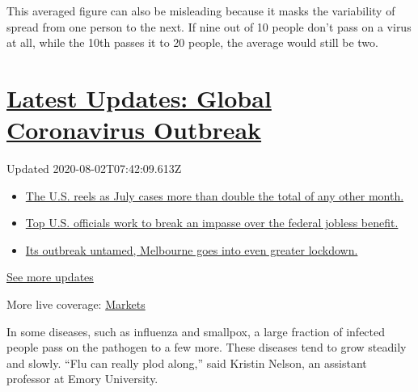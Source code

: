 This averaged figure can also be misleading because it masks the
variability of spread from one person to the next. If nine out of 10
people don't pass on a virus at all, while the 10th passes it to 20
people, the average would still be two.

\hypertarget{latest-updates-global-coronavirus-outbreak}{%
\section{\texorpdfstring{\href{https://www.nytimes.com/2020/08/01/world/coronavirus-covid-19.html?action=click\&pgtype=Article\&state=default\&region=MAIN_CONTENT_1\&context=storylines_live_updates}{Latest
Updates: Global Coronavirus
Outbreak}}{Latest Updates: Global Coronavirus Outbreak}}\label{latest-updates-global-coronavirus-outbreak}}

Updated 2020-08-02T07:42:09.613Z

\begin{itemize}
\tightlist
\item
  \href{https://www.nytimes.com/2020/08/01/world/coronavirus-covid-19.html?action=click\&pgtype=Article\&state=default\&region=MAIN_CONTENT_1\&context=storylines_live_updates\#link-34047410}{The
  U.S. reels as July cases more than double the total of any other
  month.}
\item
  \href{https://www.nytimes.com/2020/08/01/world/coronavirus-covid-19.html?action=click\&pgtype=Article\&state=default\&region=MAIN_CONTENT_1\&context=storylines_live_updates\#link-780ec966}{Top
  U.S. officials work to break an impasse over the federal jobless
  benefit.}
\item
  \href{https://www.nytimes.com/2020/08/01/world/coronavirus-covid-19.html?action=click\&pgtype=Article\&state=default\&region=MAIN_CONTENT_1\&context=storylines_live_updates\#link-2bc8948}{Its
  outbreak untamed, Melbourne goes into even greater lockdown.}
\end{itemize}

\href{https://www.nytimes.com/2020/08/01/world/coronavirus-covid-19.html?action=click\&pgtype=Article\&state=default\&region=MAIN_CONTENT_1\&context=storylines_live_updates}{See
more updates}

More live coverage:
\href{https://www.nytimes.com/live/2020/07/31/business/stock-market-today-coronavirus?action=click\&pgtype=Article\&state=default\&region=MAIN_CONTENT_1\&context=storylines_live_updates}{Markets}

In some diseases, such as influenza and smallpox, a large fraction of
infected people pass on the pathogen to a few more. These diseases tend
to grow steadily and slowly. ``Flu can really plod along,'' said Kristin
Nelson, an assistant professor at Emory University.

